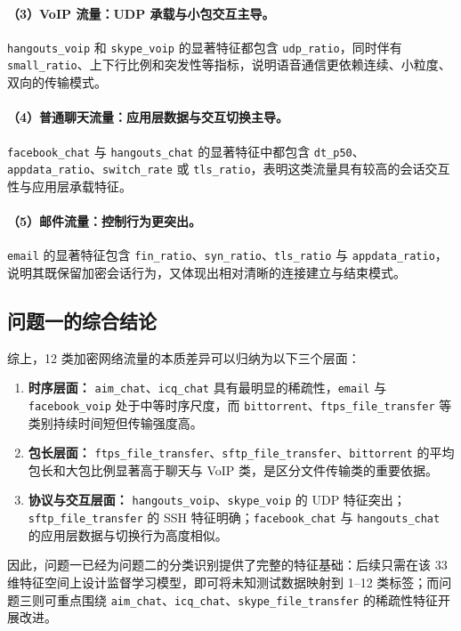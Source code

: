 \documentclass[UTF8,a4paper,12pt]{ctexart}
\begin{document}
\paragraph{（3）VoIP 流量：UDP 承载与小包交互主导。}
\texttt{hangouts\_voip} 和 \texttt{skype\_voip} 的显著特征都包含 \texttt{udp\_ratio}，同时伴有 \texttt{small\_ratio}、上下行比例和突发性等指标，说明语音通信更依赖连续、小粒度、双向的传输模式。

\paragraph{（4）普通聊天流量：应用层数据与交互切换主导。}
\texttt{facebook\_chat} 与 \texttt{hangouts\_chat} 的显著特征中都包含 \texttt{dt\_p50}、\texttt{appdata\_ratio}、\texttt{switch\_rate} 或 \texttt{tls\_ratio}，表明这类流量具有较高的会话交互性与应用层承载特征。

\paragraph{（5）邮件流量：控制行为更突出。}
\texttt{email} 的显著特征包含 \texttt{fin\_ratio}、\texttt{syn\_ratio}、\texttt{tls\_ratio} 与 \texttt{appdata\_ratio}，说明其既保留加密会话行为，又体现出相对清晰的连接建立与结束模式。

\subsection{问题一的综合结论}
综上，12 类加密网络流量的本质差异可以归纳为以下三个层面：

\begin{enumerate}[label=(\arabic*)]
    \item \textbf{时序层面：} \texttt{aim\_chat}、\texttt{icq\_chat} 具有最明显的稀疏性，\texttt{email} 与 \texttt{facebook\_voip} 处于中等时序尺度，而 \texttt{bittorrent}、\texttt{ftps\_file\_transfer} 等类别持续时间短但传输强度高。
    \item \textbf{包长层面：} \texttt{ftps\_file\_transfer}、\texttt{sftp\_file\_transfer}、\texttt{bittorrent} 的平均包长和大包比例显著高于聊天与 VoIP 类，是区分文件传输类的重要依据。
    \item \textbf{协议与交互层面：} \texttt{hangouts\_voip}、\texttt{skype\_voip} 的 UDP 特征突出；\texttt{sftp\_file\_transfer} 的 SSH 特征明确；\texttt{facebook\_chat} 与 \texttt{hangouts\_chat} 的应用层数据与切换行为高度相似。
\end{enumerate}

因此，问题一已经为问题二的分类识别提供了完整的特征基础：后续只需在该 33 维特征空间上设计监督学习模型，即可将未知测试数据映射到 1--12 类标签；而问题三则可重点围绕 \texttt{aim\_chat}、\texttt{icq\_chat}、\texttt{skype\_file\_transfer} 的稀疏性特征开展改进。
\end{document}
